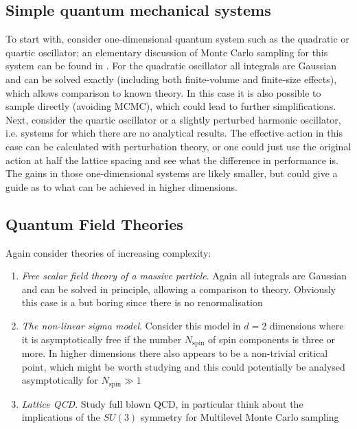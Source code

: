 \documentclass[11pt]{article}
\begin{document}
\subsection{Simple quantum mechanical systems}
To start with, consider one-dimensional quantum system such as the quadratic or quartic oscillator; an elementary discussion of Monte Carlo sampling for this system can be found in \cite{Creutz1981}. For the quadratic oscillator all integrals are Gaussian and can be solved exactly (including both finite-volume and finite-size effects), which allows comparison to known theory. In this case it is also possible to sample directly (avoiding MCMC), which could lead to further simplifications.
Next, consider the quartic oscillator or a slightly perturbed harmonic oscillator, i.e. systems for which there are no analytical results. The effective action in this case can be calculated with perturbation theory, or one could just use the original action at half the lattice spacing and see what the difference in performance is. The gains in those one-dimensional systems are likely smaller, but could give a guide as to what can be achieved in higher dimensions.
\subsection{Quantum Field Theories}
Again consider theories of increasing complexity:
\begin{enumerate}
\item \textit{Free scalar field theory of a massive particle}. Again all integrals are Gaussian and can be solved in principle, allowing a comparison to theory. Obviously this case is a but boring since there is no renormalisation
\item \textit{The non-linear sigma model}. Consider this model in $d=2$ dimensions where it is asymptotically free if the number $N_{\text{spin}}$ of spin components is three or more. In higher dimensions there also appears to be a non-trivial critical point, which might be worth studying and this could potentially be analysed asymptotically for $N_{\text{spin}}\gg 1$
  \item \textit{Lattice QCD}. Study full blown QCD, in particular think about the implications of the $SU(3)$ symmetry for Multilevel Monte Carlo sampling
\end{enumerate}
\end{document}
